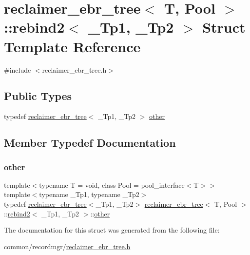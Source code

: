 \hypertarget{structreclaimer__ebr__tree_1_1rebind2}{}\section{reclaimer\+\_\+ebr\+\_\+tree$<$ T, Pool $>$\+:\+:rebind2$<$ \+\_\+\+Tp1, \+\_\+\+Tp2 $>$ Struct Template Reference}
\label{structreclaimer__ebr__tree_1_1rebind2}


{\ttfamily \#include $<$reclaimer\+\_\+ebr\+\_\+tree.\+h$>$}

\subsection*{Public Types}
\begin{DoxyCompactItemize}
\item 
typedef \hyperlink{classreclaimer__ebr__tree}{reclaimer\+\_\+ebr\+\_\+tree}$<$ \+\_\+\+Tp1, \+\_\+\+Tp2 $>$ \hyperlink{structreclaimer__ebr__tree_1_1rebind2_a97f0a1c76f89537863412d838f674128}{other}
\end{DoxyCompactItemize}


\subsection{Member Typedef Documentation}
\mbox{\label{structreclaimer__ebr__tree_1_1rebind2_a97f0a1c76f89537863412d838f674128}} 
\subsubsection{\texorpdfstring{other}{other}}
{\footnotesize\ttfamily template$<$typename T  = void, class Pool  = pool\+\_\+interface$<$\+T$>$$>$ \\
template$<$typename \+\_\+\+Tp1, typename \+\_\+\+Tp2$>$ \\
typedef \hyperlink{classreclaimer__ebr__tree}{reclaimer\+\_\+ebr\+\_\+tree}$<$\+\_\+\+Tp1, \+\_\+\+Tp2$>$ \hyperlink{classreclaimer__ebr__tree}{reclaimer\+\_\+ebr\+\_\+tree}$<$ T, Pool $>$\+::\hyperlink{structreclaimer__ebr__tree_1_1rebind2}{rebind2}$<$ \+\_\+\+Tp1, \+\_\+\+Tp2 $>$\+::\hyperlink{structreclaimer__ebr__tree_1_1rebind2_a97f0a1c76f89537863412d838f674128}{other}}



The documentation for this struct was generated from the following file\+:\begin{DoxyCompactItemize}
\item 
common/recordmgr/\hyperlink{reclaimer__ebr__tree_8h}{reclaimer\+\_\+ebr\+\_\+tree.\+h}\end{DoxyCompactItemize}
